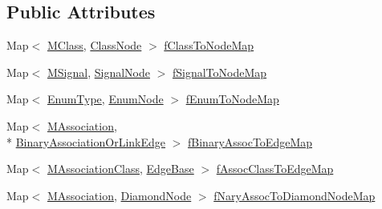 \subsection*{Public Attributes}
\begin{DoxyCompactItemize}
\item 
Map$<$ \hyperlink{interfaceorg_1_1tzi_1_1use_1_1uml_1_1mm_1_1_m_class}{M\-Class}, \hyperlink{classorg_1_1tzi_1_1use_1_1gui_1_1views_1_1diagrams_1_1classdiagram_1_1_class_node}{Class\-Node} $>$ \hyperlink{classorg_1_1tzi_1_1use_1_1gui_1_1views_1_1diagrams_1_1classdiagram_1_1_class_diagram_data_a17685b8172fa58dabe8e36aed437e7af}{f\-Class\-To\-Node\-Map}
\item 
Map$<$ \hyperlink{interfaceorg_1_1tzi_1_1use_1_1uml_1_1mm_1_1commonbehavior_1_1communications_1_1_m_signal}{M\-Signal}, \hyperlink{classorg_1_1tzi_1_1use_1_1gui_1_1views_1_1diagrams_1_1classdiagram_1_1_signal_node}{Signal\-Node} $>$ \hyperlink{classorg_1_1tzi_1_1use_1_1gui_1_1views_1_1diagrams_1_1classdiagram_1_1_class_diagram_data_a58014fb41dc96c6fa514b267c42e27c0}{f\-Signal\-To\-Node\-Map}
\item 
Map$<$ \hyperlink{classorg_1_1tzi_1_1use_1_1uml_1_1ocl_1_1type_1_1_enum_type}{Enum\-Type}, \hyperlink{classorg_1_1tzi_1_1use_1_1gui_1_1views_1_1diagrams_1_1classdiagram_1_1_enum_node}{Enum\-Node} $>$ \hyperlink{classorg_1_1tzi_1_1use_1_1gui_1_1views_1_1diagrams_1_1classdiagram_1_1_class_diagram_data_a130b05cf00a42f94ea57c2c82a952d8d}{f\-Enum\-To\-Node\-Map}
\item 
Map$<$ \hyperlink{interfaceorg_1_1tzi_1_1use_1_1uml_1_1mm_1_1_m_association}{M\-Association}, \\*
\hyperlink{classorg_1_1tzi_1_1use_1_1gui_1_1views_1_1diagrams_1_1elements_1_1edges_1_1_binary_association_or_link_edge}{Binary\-Association\-Or\-Link\-Edge} $>$ \hyperlink{classorg_1_1tzi_1_1use_1_1gui_1_1views_1_1diagrams_1_1classdiagram_1_1_class_diagram_data_a16c3c93ed7afcb1e94c90f8195e04d3e}{f\-Binary\-Assoc\-To\-Edge\-Map}
\item 
Map$<$ \hyperlink{interfaceorg_1_1tzi_1_1use_1_1uml_1_1mm_1_1_m_association_class}{M\-Association\-Class}, \hyperlink{classorg_1_1tzi_1_1use_1_1gui_1_1views_1_1diagrams_1_1elements_1_1edges_1_1_edge_base}{Edge\-Base} $>$ \hyperlink{classorg_1_1tzi_1_1use_1_1gui_1_1views_1_1diagrams_1_1classdiagram_1_1_class_diagram_data_a40c2691bcac9f914035ac36112c3f6b2}{f\-Assoc\-Class\-To\-Edge\-Map}
\item 
Map$<$ \hyperlink{interfaceorg_1_1tzi_1_1use_1_1uml_1_1mm_1_1_m_association}{M\-Association}, \hyperlink{classorg_1_1tzi_1_1use_1_1gui_1_1views_1_1diagrams_1_1elements_1_1_diamond_node}{Diamond\-Node} $>$ \hyperlink{classorg_1_1tzi_1_1use_1_1gui_1_1views_1_1diagrams_1_1classdiagram_1_1_class_diagram_data_ac05b5f12c1b1bcfd3d274b83362fc56c}{f\-Nary\-Assoc\-To\-Diamond\-Node\-Map}

\end{DoxyCompactItemize}
